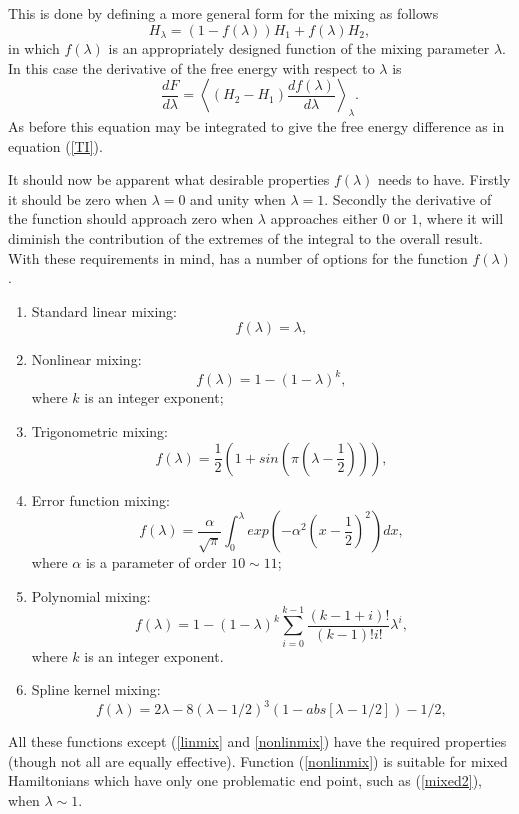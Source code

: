 This is done by defining a more general form for the mixing as follows
\begin{equation}
H_{\lambda}=(1-f(\lambda))H_{1}+f(\lambda) H_{2}, \label{mixed3}
\end{equation}
in which $f(\lambda)$ is an appropriately designed function of the mixing
parameter $\lambda$. In this case the derivative of the free energy with
respect to $\lambda$ is
\begin{equation}
\frac{d F}{d \lambda}  = \left  <(H_{2}-H_{1})\frac{d
    f(\lambda)}{d \lambda} \right >_{\lambda}. \label{genmix}
\end{equation}
As before this equation may be integrated to give the free energy difference
as in equation (\ref{TI}).  

It should now be apparent what desirable properties $f(\lambda)$ needs to
have. Firstly it should be zero when $\lambda=0$ and unity when $\lambda=1$.
Secondly the derivative of the function should approach zero when $\lambda$
approaches either $0$ or $1$, where it will diminish the contribution of the
extremes of the integral to the overall result. With these requirements in
mind, \D{} has a number of options for the function $f(\lambda)$.
\begin{enumerate}
\item Standard linear mixing:
\begin{equation}
f(\lambda)=\lambda, \label{linmix}
\end{equation}
\item Nonlinear mixing: 
\begin{equation}
f(\lambda)=1-(1-\lambda)^{k}, \label{nonlinmix}
\end{equation}
where $k$ is an integer exponent;
\item Trigonometric mixing: 
\begin{equation}
f(\lambda)=\frac{1}{2}(1+sin(\pi(\lambda-\frac{1}{2}))), \label{trigmix}
\end{equation}
\item Error function mixing:
\begin{equation}
f(\lambda)=\frac{\alpha}{\sqrt{\pi}}\int_{0}^{\lambda}exp(-\alpha^{2}(x
-\frac{1}{2})^{2})dx, \label{erfmix}
\end{equation}
where $\alpha$ is a parameter of order $10\sim 11$;
\item Polynomial mixing:
\begin{equation}
f(\lambda)=1-(1-\lambda)^{k}\sum_{i=0}^{k-1}\frac{(k-1+i)!}{(k-1)!i!}
\lambda^{i}, \label{polymix}
\end{equation}
where $k$ is an integer exponent.
\item Spline kernel mixing:
\begin{equation}
f(\lambda)=2\lambda-8(\lambda-1/2)^{3}(1-abs[\lambda-1/2])-1/2, \label{splmix}
\end{equation}
\end{enumerate}
All these functions except (\ref{linmix} and \ref{nonlinmix}) have the
required properties (though not all are equally effective). Function
(\ref{nonlinmix}) is suitable for mixed Hamiltonians which have only one
problematic end point, such as (\ref{mixed2}), when $\lambda \sim 1$.

